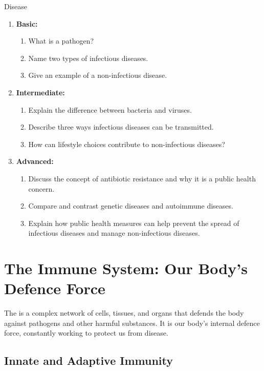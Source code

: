\begin{tieredquestions}{Disease}
\begin{enumerate}
    \item \textbf{Basic:}
    \begin{enumerate}
        \item What is a pathogen?
        \item Name two types of infectious diseases.
        \item Give an example of a non-infectious disease.
    \end{enumerate}
    \item \textbf{Intermediate:}
    \begin{enumerate}
        \item Explain the difference between bacteria and viruses.
        \item Describe three ways infectious diseases can be transmitted.
        \item How can lifestyle choices contribute to non-infectious diseases?
    \end{enumerate}
    \item \textbf{Advanced:}
    \begin{enumerate}
        \item Discuss the concept of antibiotic resistance and why it is a public health concern.
        \item Compare and contrast genetic diseases and autoimmune diseases.
        \item Explain how public health measures can help prevent the spread of infectious diseases and manage non-infectious diseases.
    \end{enumerate}
\end{enumerate}
\end{tieredquestions}


\section{The Immune System: Our Body's Defence Force}

The  is a complex network of cells, tissues, and organs that defends the body against pathogens and other harmful substances. It is our body's internal defence force, constantly working to protect us from disease.

\subsection{Innate and Adaptive Immunity}

